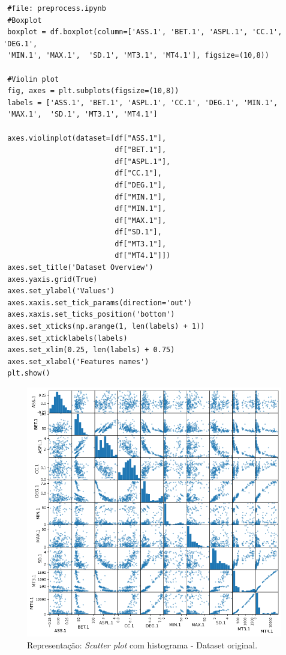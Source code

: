 \documentclass[
	article,			%
	11pt,				%
	oneside,			%
	a4paper,			%
	english,			%
	brazil,				%
	sumario=tradicional
	]{abntex2}
\begin{document}
\begin{verbatim}
 #file: preprocess.ipynb
 #Boxplot
 boxplot = df.boxplot(column=['ASS.1', 'BET.1', 'ASPL.1', 'CC.1', 'DEG.1',
 'MIN.1', 'MAX.1',  'SD.1', 'MT3.1', 'MT4.1'], figsize=(10,8))
 
 #Violin plot
 fig, axes = plt.subplots(figsize=(10,8))
 labels = ['ASS.1', 'BET.1', 'ASPL.1', 'CC.1', 'DEG.1', 'MIN.1',
 'MAX.1',  'SD.1', 'MT3.1', 'MT4.1']

 axes.violinplot(dataset=[df["ASS.1"],
                          df["BET.1"],
                          df["ASPL.1"],
                          df["CC.1"],
                          df["DEG.1"],
                          df["MIN.1"],
                          df["MIN.1"],
                          df["MAX.1"],
                          df["SD.1"],
                          df["MT3.1"],
                          df["MT4.1"]])
 axes.set_title('Dataset Overview')
 axes.yaxis.grid(True)
 axes.set_ylabel('Values')
 axes.xaxis.set_tick_params(direction='out')
 axes.xaxis.set_ticks_position('bottom')
 axes.set_xticks(np.arange(1, len(labels) + 1))
 axes.set_xticklabels(labels)
 axes.set_xlim(0.25, len(labels) + 0.75)
 axes.set_xlabel('Features names')
 plt.show()
\end{verbatim}

\newpage
\begin{figure}[H]
 \centering
 \includegraphics[scale=0.5]{fig/scatter_hist01.png}
 \caption{Representação: \textit{Scatter plot} com histograma - Dataset original.}
 \label{fig:scatter_hist01}
\end{figure}
\end{document}
